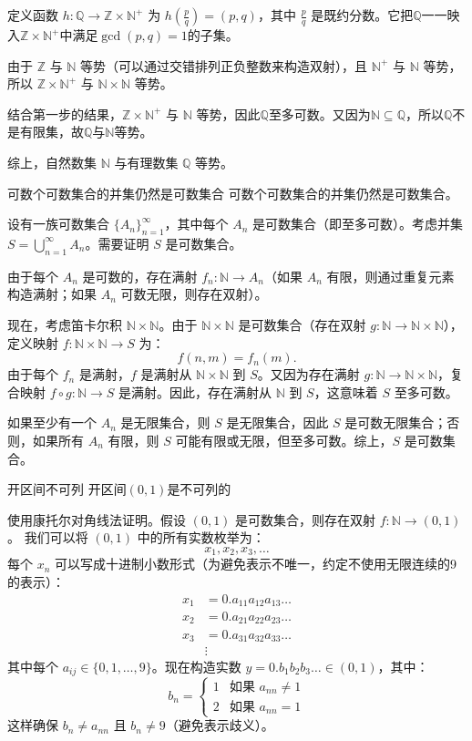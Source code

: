 定义函数 $h: \mathbb{Q} \to \mathbb{Z} \times \mathbb{N}^+$ 为 $h\left(\frac{p}{q}\right) = (p,q)$，其中 $\frac{p}{q}$ 是既约分数。它把$\mathbb{Q}$一一映入$\mathbb{Z} \times \mathbb{N}^+$中满足$\gcd(p,q)=1$的子集。

由于 $\mathbb{Z}$ 与 $\mathbb{N}$ 等势（可以通过交错排列正负整数来构造双射），且 $\mathbb{N}^+$ 与 $\mathbb{N}$ 等势，所以 $\mathbb{Z} \times \mathbb{N}^+$ 与 $\mathbb{N} \times \mathbb{N}$ 等势。

结合第一步的结果，$\mathbb{Z} \times \mathbb{N}^+$ 与 $\mathbb{N}$ 等势，因此$\mathbb{Q}$至多可数。又因为$\mathbb{N}\subseteq\mathbb{Q}$，所以$\mathbb{Q}$不是有限集，故$\mathbb{Q}$与$\mathbb{N}$等势。

综上，自然数集 $\mathbb{N}$ 与有理数集 $\mathbb{Q}$ 等势。
\begin{theorem}{可数个可数集合的并集仍然是可数集合}{}
    可数个可数集合的并集仍然是可数集合。
    
    设有一族可数集合 $\{A_n\}_{n=1}^\infty$，其中每个 $A_n$ 是可数集合（即至多可数）。考虑并集 $S = \bigcup_{n=1}^\infty A_n$。需要证明 $S$ 是可数集合。
\end{theorem}
由于每个 $A_n$ 是可数的，存在满射 $f_n: \mathbb{N} \to A_n$（如果 $A_n$ 有限，则通过重复元素构造满射；如果 $A_n$ 可数无限，则存在双射）。

现在，考虑笛卡尔积 $\mathbb{N} \times \mathbb{N}$。由于 $\mathbb{N} \times \mathbb{N}$ 是可数集合（存在双射 $g: \mathbb{N} \to \mathbb{N} \times \mathbb{N}$），定义映射 $f: \mathbb{N} \times \mathbb{N} \to S$ 为：
\[
f(n, m) = f_n(m).
\]
由于每个 $f_n$ 是满射，$f$ 是满射从 $\mathbb{N} \times \mathbb{N}$ 到 $S$。又因为存在满射 $g: \mathbb{N} \to \mathbb{N} \times \mathbb{N}$，复合映射 $f \circ g: \mathbb{N} \to S$ 是满射。因此，存在满射从 $\mathbb{N}$ 到 $S$，这意味着 $S$ 至多可数。

如果至少有一个 $A_n$ 是无限集合，则 $S$ 是无限集合，因此 $S$ 是可数无限集合；否则，如果所有 $A_n$ 有限，则 $S$ 可能有限或无限，但至多可数。综上，$S$ 是可数集合。
\begin{theorem}{开区间不可列}{}
    开区间$(0,1)$是不可列的
\end{theorem}
使用康托尔对角线法证明。假设 $(0,1)$ 是可数集合，则存在双射 $f: \mathbb{N} \to (0,1)$。
我们可以将 $(0,1)$ 中的所有实数枚举为：
\[
x_1, x_2, x_3, \dots
\]
每个 $x_n$ 可以写成十进制小数形式（为避免表示不唯一，约定不使用无限连续的9的表示）：
\[
\begin{aligned}
x_1 &= 0.a_{11}a_{12}a_{13}\dots \\
x_2 &= 0.a_{21}a_{22}a_{23}\dots \\
x_3 &= 0.a_{31}a_{32}a_{33}\dots \\
&\vdots
\end{aligned}
\]
其中每个 $a_{ij} \in \{0,1,\dots,9\}$。现在构造实数 $y = 0.b_1b_2b_3\dots \in (0,1)$，其中：
\[
b_n = 
\begin{cases}
1 & \text{如果 } a_{nn} \neq 1 \\
2 & \text{如果 } a_{nn} = 1
\end{cases}
\]
这样确保 $b_n \neq a_{nn}$ 且 $b_n \neq 9$（避免表示歧义）。

